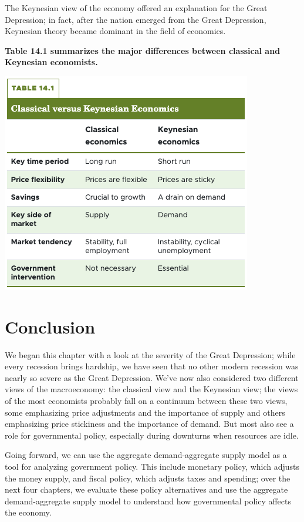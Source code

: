 \documentclass[11pt]{article} %
\begin{document}
The Keynesian view of the economy offered an explanation for the Great Depression; in fact, after the nation emerged from the Great Depression, Keynesian theory became dominant in the field of economics.

\textbf{Table 14.1 summarizes the major differences between classical and Keynesian economists.}

\begin{center}
\includegraphics[scale=0.5]{images/Table 14.1.png} 
\end{center}

\section*{Conclusion}
We began this chapter with a look at the severity of the Great Depression; while every recession brings hardship, we have seen that no other modern recession was nearly so severe as the Great Depression. We've now also considered two different views of the macroeconomy: the classical view and the Keynesian view; the views of the most economists probably fall on a continuum between these two views, some emphasizing price adjustments and the importance of supply and others emphasizing price stickiness and the importance of demand. But most also see a role for governmental policy, especially during downturns when resources are idle.

Going forward, we can use the aggregate demand-aggregate supply model as a tool for analyzing government policy. This include monetary policy, which adjusts the money supply, and fiscal policy, which adjusts taxes and spending; over the next four chapters, we evaluate these policy alternatives and use the aggregate demand-aggregate supply model to understand how governmental policy affects the economy. 
\end{document}
